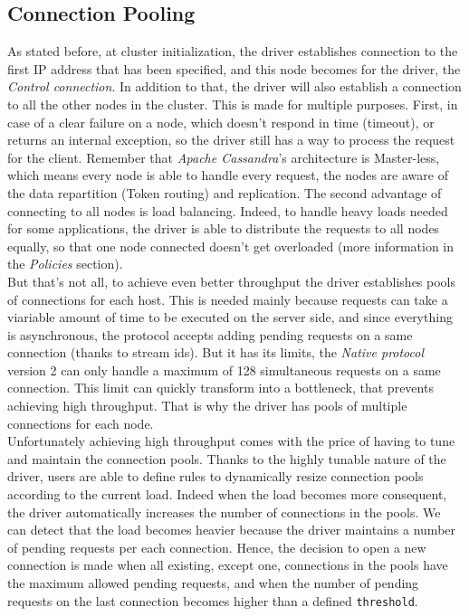 \documentclass[a4paper]{report}
\newcommand{\ca}{\emph{Apache Cassandra\xspace}}
\begin{document}
\subsection{Connection Pooling}
As stated before, at cluster initialization, the driver establishes connection to the first IP address that has been specified, and this node becomes for the driver, the \emph{Control connection}. In addition to that, the driver will also establish a connection to all the other nodes in the cluster. This is made for multiple purposes. First, in case of a clear failure on a node, which doesn't respond in time (timeout), or returns an internal exception, so the driver still has a way to process the request for the client. Remember that \ca{}'s architecture is Master-less, which means every node is able to handle every request, the nodes are aware of the data repartition (Token routing) and replication. The second advantage of connecting to all nodes is load balancing. Indeed, to handle heavy loads needed for some applications, the driver is able to distribute the requests to all nodes equally, so that one node connected doesn't get overloaded (more information in the \emph{Policies} section).\\
But that's not all, to achieve even better throughput the driver establishes pools of connections for each host. This is needed mainly because requests can take a viariable amount of time to be executed on the server side, and since everything is asynchronous, the protocol accepts adding pending requests on a same connection (thanks to stream ids). But it has its limits, the \emph{Native protocol} version 2 can only handle a maximum of 128 simultaneous requests on a same connection. This limit can quickly transform into a bottleneck, that prevents achieving high throughput. That is why the driver has pools of multiple connections for each node.\\
Unfortunately achieving high throughput comes with the price of having to tune and maintain the connection pools. Thanks to the highly tunable nature of the driver, users are able to define rules to dynamically resize connection pools according to the current load. Indeed when the load becomes more consequent, the driver automatically increases the number of connections in the pools. We can detect that the load becomes heavier because the driver maintains a number of pending requests per each connection. Hence, the decision to open a new connection is made when all existing, except one, connections in the pools have the maximum allowed pending requests, and when the number of pending requests on the last connection becomes higher than a defined \verb;threshold;.\\
\end{document}
